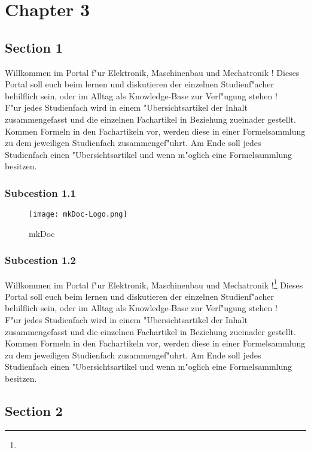 \chapter{Chapter 3}
\label{cha:Chapter3}

\section{Section 1}
\label{sec:3Section1}
Willkommen im Portal f"ur Elektronik, Maschinenbau und Mechatronik !
Dieses Portal soll euch beim lernen und diskutieren der einzelnen Studienf"acher behilflich sein, oder im Alltag als Knowledge-Base zur Verf"ugung stehen ! \\
F"ur jedes Studienfach wird in einem "Ubersichtsartikel der Inhalt zusammengefasst und die einzelnen Fachartikel in Beziehung zueinader gestellt. Kommen Formeln in den Fachartikeln vor, werden diese in einer Formelsammlung zu dem jeweiligen Studienfach zusammengef"uhrt. Am Ende soll jedes Studienfach einen "Ubersichtsartikel und wenn m"oglich eine Formelsammlung besitzen.

\subsection{Subcestion 1.1}
\label{subsec:3Subcestion1.1}

\begin{figure}[htb]
\centering
\texttt{[image: mkDoc-Logo.png]}
\caption{mkDoc}
\label{fig:mkDoc}
\end{figure}


\subsection{Subcestion 1.2}
\label{subsec:3Subcestion 1.2}
Willkommen im Portal f"ur Elektronik, Maschinenbau und Mechatronik !\footnote{\Vgl{}}
Dieses Portal soll euch beim lernen und diskutieren der einzelnen Studienf"acher behilflich sein, oder im Alltag als Knowledge-Base zur Verf"ugung stehen ! \\
F"ur jedes Studienfach wird in einem "Ubersichtsartikel der Inhalt zusammengefasst und die einzelnen Fachartikel in Beziehung zueinader gestellt. Kommen Formeln in den Fachartikeln vor, werden diese in einer Formelsammlung zu dem jeweiligen Studienfach zusammengef"uhrt. Am Ende soll jedes Studienfach einen "Ubersichtsartikel und wenn m"oglich eine Formelsammlung besitzen.

\section{Section 2}
\label{sec:3Section2}

